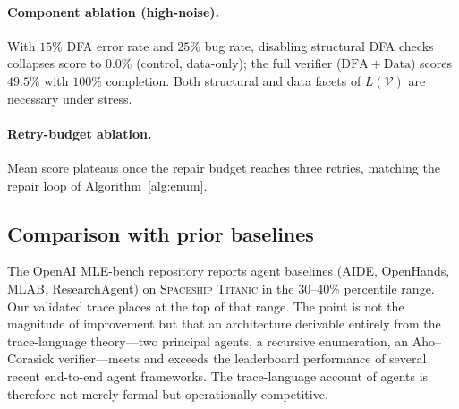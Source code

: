 \paragraph{Component ablation (high-noise).}
With $15\%$ DFA error rate and $25\%$ bug rate, disabling structural
DFA checks collapses score to $0.0\%$ (control, data-only); the full
verifier ($\mathrm{DFA}{+}\mathrm{Data}$) scores $49.5\%$ with $100\%$
completion.  Both structural and data facets of $L(\mathcal{V})$ are
necessary under stress.

\paragraph{Retry-budget ablation.}
Mean score plateaus once the repair budget reaches three retries,
matching the repair loop of Algorithm~\ref{alg:enum}.

\subsection{Comparison with prior baselines}

The OpenAI MLE-bench repository reports agent baselines (AIDE,
OpenHands, MLAB, ResearchAgent) on \textsc{Spaceship Titanic} in the
30--40\% percentile range.  Our validated trace places at the top of
that range.  The point is not the magnitude of improvement but that
an architecture derivable entirely from the trace-language
theory---two principal agents, a recursive enumeration, an
Aho--Corasick verifier---meets and exceeds the leaderboard
performance of several recent end-to-end agent frameworks.  The
trace-language account of agents is therefore not merely formal but
operationally competitive.
